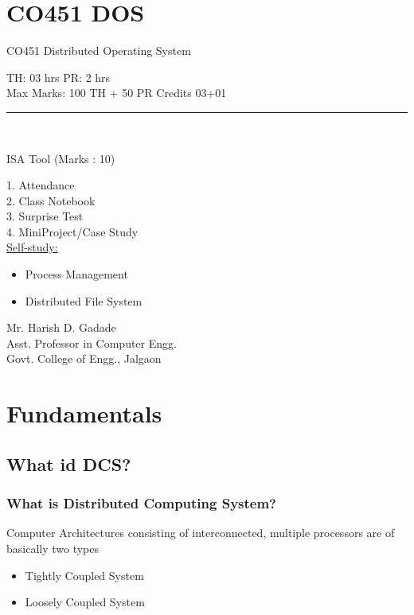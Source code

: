 \documentclass{beamer}
\begin{document}
   


\section{CO451 DOS}
\begin{frame}
\begin{center}
\huge CO451 Distributed Operating System\\
\end{center}
TH: 03 hrs
\hspace{5cm}
PR: 2 hrs\\
Max Marks: 100 TH + 50 PR
\hspace{2cm}
Credits 03+01\\
\noindent\rule{10.5cm}{0.4pt}\\
\begin{center}
ISA Tool (Marks : 10)\\
\end{center}
\hspace{2cm}1. Attendance\\
\hspace{2cm}2. Class Notebook\\
\hspace{2cm}3. Surprise Test\\
\hspace{2cm}4. MiniProject/Case Study\\
\underline{Self-study:}
\begin{itemize}
	\item Process Management
	\item Distributed File System
\end{itemize}
\hspace{6cm}Mr. Harish D. Gadade\\
\hspace{5cm}Asst. Professor in Computer Engg.\\
\hspace{5.2cm}Govt. College of Engg., Jalgaon
\end{frame} 



\section{Fundamentals}
\subsection{What id DCS?}
    \begin{frame}
        \frametitle{What is Distributed Computing System?}
            Computer Architectures consisting of interconnected, multiple processors are of basically two types
        \vspace{0.02cm}
        \begin{itemize}
        	\item Tightly Coupled System
            \item Loosely Coupled System
        \end{itemize}
        \vspace{5cm}
    \end{frame}
\end{document}
